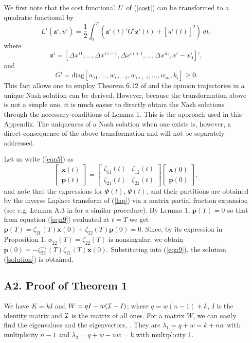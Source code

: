 \documentclass[10pt, conference, compsocconf]{IEEEtran}
\begin{document}
We first note that the cost functional $L^i$ of (\ref{cost}) can be transformed to a quadratic functional by  
\[ 
L^i(\mathbf{z}^i, u^i) = \frac{1}{2} \int_0^T \left({\mathbf{z}^i}(t)' G^i \mathbf{z}^i(t)+[u^{i}(t)]^2\right)\ dt,
\]
where
\[ 
\mathbf{z}^i = \left[ \Delta x^{i1}, ... , \Delta x^{i \ i-1}, \Delta x^{i \ i+1}, ... , \Delta x^{in}, x^i-x_0^i \right]',
\]
and
\[ G^i = \mbox{diag} \left[ w_{i1}, ... , w_{i \ i-1}, w_{i \ i+1}, ... , w_{in}, k_i \right] \geq 0.
\]
This fact allows one to employ Theorem 6.12 of \cite{basar} and the opinion trajectories in a unique Nash solution can be derived. However, because the transformation above is not a simple one, it is much easier to directly obtain the Nash solutions through the necessary conditions of Lemma 1. This is the approach used in this Appendix. The uniqueness of a Nash solution when one exists is, however, a direct consequence of the above transformation and will not be separately addressed.

Let us write (\ref{eqn5}) as
\begin{equation} \label{eqn9}
\left[ \begin{array}{c}
\mathbf{x}(t) \\ \mathbf{p}(t)
\end{array} \right] = \left[ \begin{array}{cc}
\zeta_{11}(t) & \zeta_{12}(t) \\ \zeta_{21}(t) & \zeta_{22}(t)
\end{array} \right] \left[ \begin{array}{c}
\mathbf{x}(0) \\ \mathbf{p}(0)
\end{array} \right],
\end{equation}
and note that the expressions for $\Phi(t)$, $\Psi(t)$, and their partitions are obtained by the inverse Laplace transform of (\ref{lap}) via a matrix partial fraction expansion (see e.g. Lemma A.3  in \cite{ozguler2} for a similar procedure).  By Lemma 1, $\mathbf{p}(T) = 0$ so that from equation (\ref{eqn9}) evaluated at $t=T$ we get $\mathbf{p}(T)=\zeta_{21}(T)\mathbf{x}(0) + \zeta_{22}(T)\mathbf{p}(0) = 0$. Since, by its expression in Proposition 1, $\phi_{22}(T)=\zeta_{22}(T)$ is nonsingular, we obtain 
$\mathbf{p}(0)=- \zeta_{22}^{-1}(T) \zeta_{21}(T) \mathbf{x}(0)$. Substituting into 
(\ref{eqn9}), the solution (\ref{solution}) is obtained. 

\subsection*{A2. Proof of Theorem 1}
We have  $K = kI$ and $W = qI - w({\cal{I}}-I)$; where $q = w(n-1) + k$, $I$ is the identity matrix and $\cal{I}$ is the matrix of all ones. For a matrix $W$, we can easily find the eigenvalues and the eigenvectors, \cite{ozguler}. They are 
$\lambda_1 = q+w= k+nw$ with multiplicity $n-1$ and $\lambda_2 = q+w-nw= k$ with multiplicity 1.
\end{document}

